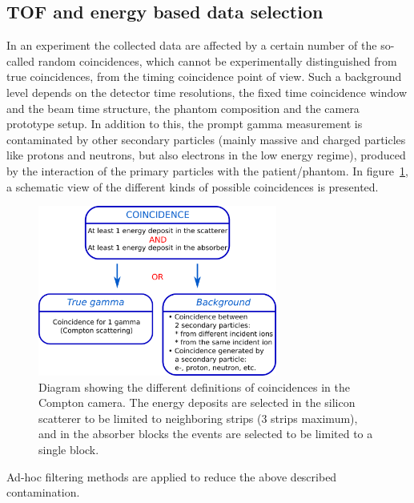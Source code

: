 \subsection{TOF and energy based data selection}
\label{MatMeth::TOF_Ecut}

In an experiment the collected data are affected by a certain number of the so-called random coincidences, which cannot be experimentally distinguished from true coincidences, from the timing coincidence point of view. Such a background level depends on the detector time resolutions, the fixed time coincidence window and the beam time structure, the phantom composition and the camera prototype setup.
In addition to this, the prompt gamma measurement is contaminated by other secondary particles (mainly massive and charged particles like protons and neutrons, but also electrons in the low energy regime), produced by the interaction of the primary particles with the patient/phantom. In figure~\ref{fig:fig_explication_coincidence_CC_simulation_Hadronth}, a schematic view of the different kinds of possible coincidences is presented.

\begin{figure}
  \centering
  \includegraphics[width=0.7\textwidth]{./Figure/coinc_scheme.png}
  \caption{Diagram showing the different definitions of coincidences in the Compton camera. The energy deposits are selected in the silicon scatterer to be limited to neighboring strips (3 strips maximum), and in the absorber blocks the events are selected to be limited to a single block.}
  \label{fig:fig_explication_coincidence_CC_simulation_Hadronth}
\end{figure}
Ad-hoc filtering methods are applied to reduce the above described contamination.


